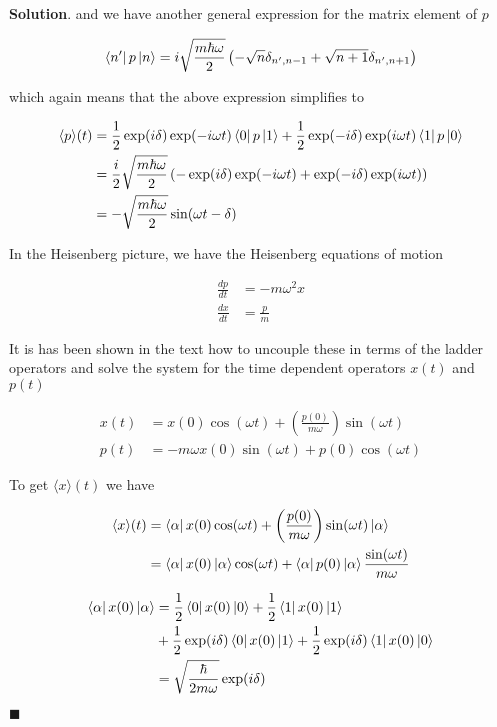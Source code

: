 \documentclass[12pt]{article}
\theoremstyle{definition}
\newenvironment{s}{%
        \begin{trivlist} \item \textbf{Solution}. }{%
            \hspace*{\fill} $\blacksquare$\end{trivlist}}%
\begin{document}
{\begin{s}
and we have another general expression for the matrix element of $p$

\begin{align*}
\bra{n'}p\ket{n} = i\sqrt{\frac{m\hbar\omega}{2}}\left(-\sqrt{n}\delta_{n',n-1} +\sqrt{n+1}\delta_{n',n+1}\right)
\end{align*}

which again means that the above expression simplifies to 

\begin{align*}
\langle p\rangle(t) &= \frac{1}{2}\exp(i\delta)\exp(-i\omega t)\bra{0}p\ket{1} + \frac{1}{2}\exp(-i\delta)\exp(i\omega t)\bra{1}p\ket{0}\\
&= \frac{i}{2}\sqrt{\frac{m\hbar\omega}{2}}\left(-\exp(i\delta)\exp(-i\omega t)+\exp(-i\delta)\exp(i\omega t)\right)\\
&= -\sqrt{\frac{m\hbar\omega}{2}}\sin(\omega t - \delta)
\end{align*}

In the Heisenberg picture, we have the Heisenberg equations of motion

\begin{align*}
\frac{dp}{dt} &= -m\omega^{2}x\\
\frac{dx}{dt} &= \frac{p}{m}
\end{align*}

It is has been shown in the text how to uncouple these in terms of the ladder operators and solve the system for the time dependent operators $x(t)$ and $p(t)$

\begin{align*}
x(t) &= x(0)\cos(\omega t) + \left(\frac{p(0)}{m\omega}\right)\sin(\omega t)\\
p(t) &= -m\omega x(0)\sin(\omega t) + p(0)\cos(\omega t)
\end{align*}

To get $\langle x \rangle (t)$ we have

\begin{align*}
\langle x \rangle (t) &= \bra{\alpha} x(0)\cos(\omega t) + \left(\frac{p(0)}{m\omega}\right)\sin(\omega t) \ket{\alpha}\\
&= \bra{\alpha}x(0)\ket{\alpha}\cos(\omega t) + \bra{\alpha} p(0)\ket{\alpha}\frac{\sin(\omega t)}{m\omega}
\end{align*}

\begin{align*}
\bra{\alpha}x(0)\ket{\alpha} &= \frac{1}{2}\bra{0}x(0)\ket{0} + \frac{1}{2}\bra{1}x(0)\ket{1} \\
&+ \frac{1}{2}\exp(i\delta)\bra{0}x(0)\ket{1}+ \frac{1}{2}\exp(i\delta)\bra{1}x(0)\ket{0}\\
&= \sqrt{\frac{\hbar}{2m\omega}}\exp(i\delta)
\end{align*}


\end{s}}
\end{document}

